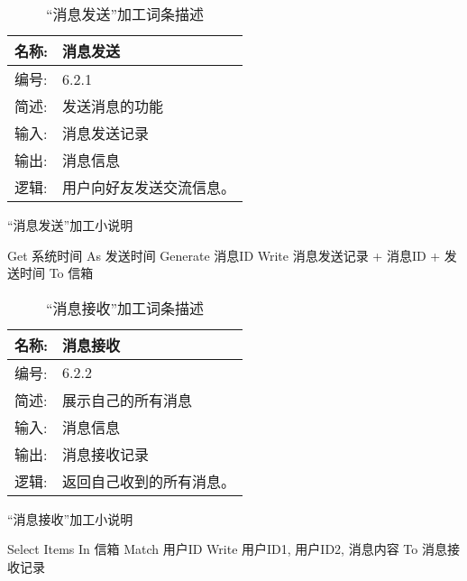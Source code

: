 \begin{table}[H]  
\caption{“消息发送”加工词条描述}  
\begin{center}  
    \begin{tabular}{l p{11cm}} 
        \hline
        \quad 名称:  &  消息发送 \\
        \hline
        \quad 编号:  & 6.2.1 \\
        \hline
        \quad 简述:  & 发送消息的功能 \\
        \hline
        \quad 输入:  & 消息发送记录\\
        \hline
        \quad 输出:  & 消息信息 \\
        \hline
        \quad 逻辑:  & 用户向好友发送交流信息。 \\
        \hline
    \end{tabular}
    \label{tab1}
\end{center}
\end{table}

\begin{algorithm}[H]
    \renewcommand{\thealgorithm}{}
    \caption{“消息发送”加工小说明} 
    \label{alg3} 
    \begin{algorithmic}[1]
        \STATE Get 系统时间 As 发送时间
        \STATE Generate 消息ID 
        \STATE Write 消息发送记录 + 消息ID + 发送时间 To 信箱
    \end{algorithmic} 
\end{algorithm}

\begin{table}[H]  
\caption{“消息接收”加工词条描述}  
\begin{center}  
    \begin{tabular}{l p{11cm}} 
        \hline
        \quad 名称:  &   消息接收 \\
        \hline
        \quad 编号:  & 6.2.2 \\
        \hline
        \quad 简述:  & 展示自己的所有消息 \\
        \hline
        \quad 输入:  & 消息信息 \\
        \hline
        \quad 输出:  & 消息接收记录 \\
        \hline
        \quad 逻辑:  & 返回自己收到的所有消息。 \\
        \hline
    \end{tabular}
    \label{tab1}
\end{center}
\end{table}

\begin{algorithm}[H]
    \renewcommand{\thealgorithm}{}
    \caption{“消息接收”加工小说明} 
    \label{alg3} 
    \begin{algorithmic}[1]
        \STATE Select Items In 信箱 Match 用户ID
        \STATE Write 用户ID1, 用户ID2, 消息内容 To 消息接收记录
    \end{algorithmic} 
\end{algorithm}
